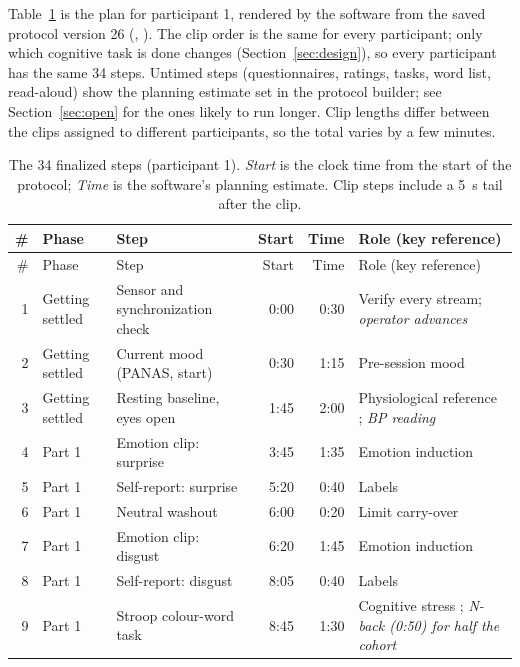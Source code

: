\documentclass[11pt,a4paper]{article}
\newcommand{\code}[1]{\texttt{\detokenize{#1}}}
\begin{document}
Table~\ref{tab:plan} is the plan for participant 1, rendered by the software from the saved protocol version 26
(\code{lib/protocol-template.ts}, \code{renderPlan}). The clip order is the same for every participant; only which
cognitive task is done changes (Section~\ref{sec:design}), so every participant has the same 34 steps.
Untimed steps (questionnaires, ratings, tasks, word list, read-aloud) show the planning estimate set in the protocol
builder; see Section~\ref{sec:open} for the ones likely to run longer.
Clip lengths differ between the clips assigned to different participants, so the total varies by a few minutes.

{\small
\begin{longtable}{@{}r >{\raggedright\arraybackslash}p{2.3cm} >{\raggedright\arraybackslash}p{4.3cm} r r >{\raggedright\arraybackslash}p{5.4cm}@{}}
\caption{The 34 finalized steps (participant 1). \emph{Start} is the clock time from the start of the protocol; \emph{Time}
is the software's planning estimate. Clip steps include a 5~s tail after the clip.}\label{tab:plan}\\
\toprule
\# & Phase & Step & Start & Time & Role (key reference) \\
\midrule\endfirsthead
\toprule
\# & Phase & Step & Start & Time & Role (key reference) \\
\midrule\endhead
1 & Getting settled & Sensor and synchronization check & 0:00 & 0:30 & Verify every stream; \textit{operator advances} \\
2 & Getting settled & Current mood (PANAS, start) & 0:30 & 1:15 & Pre-session mood \cite{watson1988} \\
3 & Getting settled & Resting baseline, eyes open & 1:45 & 2:00 & Physiological reference \cite{jennings1992,taskforce1996}; \textit{BP reading} \\
4 & Part 1 & Emotion clip: surprise & 3:45 & 1:35 & Emotion induction \cite{gross1995} \\
5 & Part 1 & Self-report: surprise & 5:20 & 0:40 & Labels \cite{bradley1994} \\
6 & Part 1 & Neutral washout & 6:00 & 0:20 & Limit carry-over \cite{rottenberg2007} \\
7 & Part 1 & Emotion clip: disgust & 6:20 & 1:45 & Emotion induction \\
8 & Part 1 & Self-report: disgust & 8:05 & 0:40 & Labels \\
9 & Part 1 & Stroop colour-word task & 8:45 & 1:30 & Cognitive stress \cite{stroop1935,renaud1997}; \textit{N-back (0:50) for half the cohort} \\

\end{longtable}}
\end{document}
